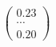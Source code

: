 \documentclass[preview]{standalone}
\begin{document}
\begin{align*}
\begin{pmatrix} 0.23\\ \cdots\\ 0.20 \end{pmatrix}
\end{align*}
\end{document}
